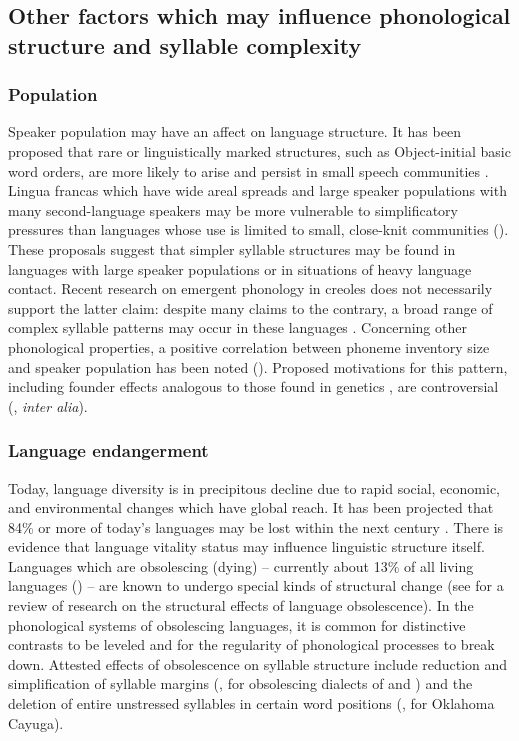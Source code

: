 \subsection{Other factors which may influence phonological structure and syllable complexity}\label{sec:2.1.2}
\subsubsection{{Population}}\label{sec:2.1.2.1}

  Speaker population may have an affect on language structure. It has been proposed that rare or linguistically marked structures, such as Object-initial basic word orders, are more likely to arise and persist in small speech communities \citep{Nettle1999a}. Lingua francas which have wide areal spreads and large speaker populations with many second-language speakers may be more vulnerable to simplificatory pressures than languages whose use is limited to small, close-knit communities (\citealt{Nettle1999b,LupyanDale2010}). These proposals suggest that simpler syllable structures may be found in languages with large speaker populations or in situations of heavy language contact. Recent research on emergent phonology in creoles does not necessarily support the latter claim: despite many claims to the contrary, a broad range of complex syllable patterns may occur in these languages \citep{Schramm2014}. Concerning other phonological properties, a positive correlation between phoneme inventory size and speaker population has been noted (\citealt{HayBauer2007}). Proposed motivations for this pattern, including founder effects analogous to those found in genetics \citep{Atkinson2011}, are controversial (\citealt{Bybee2011,MaddiesonEtAl2011,HunleyEtAl2012}, \textit{inter alia}).

\subsubsection{{Language} {endangerment}}\label{sec:2.1.2.2}

  Today, language diversity is in precipitous decline due to rapid social, economic, and environmental changes which have global reach. It has been projected that 84\% or more of today’s languages may be lost within the next century \citep[113-114]{Nettle1999b}. There is evidence that language vitality status may influence linguistic structure itself. Languages which are obsolescing (dying) -- currently about 13\% of all living languages (\citealt{SimonsFennig2018}) -- are known to undergo special kinds of structural change (see \citealt{Romaine2010} for a review of research on the structural effects of language obsolescence). In the phonological systems of obsolescing languages, it is common for distinctive contrasts to be leveled and for the regularity of phonological processes to break down. Attested effects of obsolescence on syllable structure include reduction and simplification of syllable margins (\citealt{Cook1989}, for obsolescing dialects of  and ) and the deletion of entire unstressed syllables in certain word positions (\citealt{Mithun1989}, for Oklahoma Cayuga).

